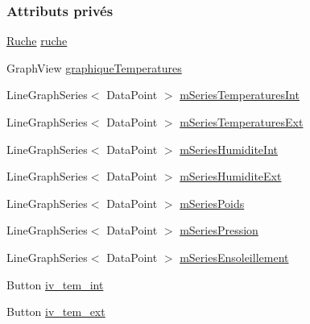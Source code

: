 \subsubsection*{Attributs privés}
\begin{DoxyCompactItemize}
\item 
\hyperlink{classfr_1_1campus_1_1laurainc_1_1honeybee_1_1_ruche}{Ruche} \hyperlink{classfr_1_1campus_1_1laurainc_1_1honeybee_1_1_graph_activity_ae4312ed40c4a4bf731eb0834155165de}{ruche}
\item 
Graph\+View \hyperlink{classfr_1_1campus_1_1laurainc_1_1honeybee_1_1_graph_activity_ab266262244788c2878b8f1b0587ae5ad}{graphique\+Temperatures}
\item 
Line\+Graph\+Series$<$ Data\+Point $>$ \hyperlink{classfr_1_1campus_1_1laurainc_1_1honeybee_1_1_graph_activity_a0a5faff0e85294ef75aa3b1afb0f8cf2}{m\+Series\+Temperatures\+Int}
\item 
Line\+Graph\+Series$<$ Data\+Point $>$ \hyperlink{classfr_1_1campus_1_1laurainc_1_1honeybee_1_1_graph_activity_ab4e67db85750e356273ec881b5d7849a}{m\+Series\+Temperatures\+Ext}
\item 
Line\+Graph\+Series$<$ Data\+Point $>$ \hyperlink{classfr_1_1campus_1_1laurainc_1_1honeybee_1_1_graph_activity_aebad7eb40c8666969929c1e0255c38b2}{m\+Series\+Humidite\+Int}
\item 
Line\+Graph\+Series$<$ Data\+Point $>$ \hyperlink{classfr_1_1campus_1_1laurainc_1_1honeybee_1_1_graph_activity_a191bf203708992e5708ddfd602d15d7e}{m\+Series\+Humidite\+Ext}
\item 
Line\+Graph\+Series$<$ Data\+Point $>$ \hyperlink{classfr_1_1campus_1_1laurainc_1_1honeybee_1_1_graph_activity_a6287d8e68e9e3f445a1210aaac4fed17}{m\+Series\+Poids}
\item 
Line\+Graph\+Series$<$ Data\+Point $>$ \hyperlink{classfr_1_1campus_1_1laurainc_1_1honeybee_1_1_graph_activity_add9a9c84ba52f748a7dd8c214f2a0484}{m\+Series\+Pression}
\item 
Line\+Graph\+Series$<$ Data\+Point $>$ \hyperlink{classfr_1_1campus_1_1laurainc_1_1honeybee_1_1_graph_activity_aa8c09689c2a865130f123b0b135b669e}{m\+Series\+Ensoleillement}
\item 
Button \hyperlink{classfr_1_1campus_1_1laurainc_1_1honeybee_1_1_graph_activity_a87bc6d987048615fed69785ee38e9b86}{iv\+\_\+tem\+\_\+int}
\item 
Button \hyperlink{classfr_1_1campus_1_1laurainc_1_1honeybee_1_1_graph_activity_a3b757042d1dec4fb097bb37f3a06d516}{iv\+\_\+tem\+\_\+ext}
\item 

\end{DoxyCompactItemize}
